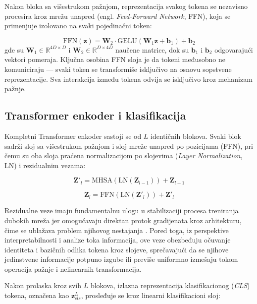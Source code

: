 Nakon bloka sa višestrukom pažnjom, reprezentacija svakog tokena se nezavisno procesira kroz mrežu unapred (engl. \textit{Feed-Forward Network}, FFN), koja se primenjuje izolovano na svaki pojedinačni token:

\begin{equation}
    \text{FFN}(\mathbf{z}) = \mathbf{W}_2 \cdot \text{GELU}(\mathbf{W}_1 \mathbf{z} + \mathbf{b}_1) + \mathbf{b}_2
\end{equation}
gde su $\mathbf{W}_1 \in \mathbb{R}^{4D \times D}$ i $\mathbf{W}_2 \in \mathbb{R}^{D \times 4D}$ 
naučene matrice, dok su $\mathbf{b}_1$ i $\mathbf{b}_2$ odgovarajući vektori pomeraja. Ključna osobina FFN sloja je da tokeni međusobno ne komuniciraju — 
svaki token se transformiše isključivo na osnovu sopstvene reprezentacije. Sva 
interakcija između tokena odvija se isključivo kroz mehanizam pažnje.

\subsection{Transformer enkoder i klasifikacija}

Kompletni Transformer enkoder sastoji se od $L$ identičnih blokova. Svaki blok sadrži sloj sa višestrukom pažnjom i sloj mreže unapred po pozicijama (FFN), pri čemu su oba sloja praćena normalizacijom po slojevima (\textit{Layer Normalization}, LN) i rezidualnim vezama:

\begin{equation}
    \mathbf{Z}'_l = \text{MHSA}(\text{LN}(\mathbf{Z}_{l-1})) + \mathbf{Z}_{l-1}
\end{equation}

\begin{equation}
    \mathbf{Z}_l = \text{FFN}(\text{LN}(\mathbf{Z}'_l)) + \mathbf{Z}'_l
\end{equation}

Rezidualne veze imaju fundamentalnu ulogu u stabilizaciji procesa treniranja dubokih 
mreža jer omogućavaju direktan protok gradijenata kroz arhitekturu, čime se ublažava 
problem njihovog nestajanja \cite{he2016resnet}. Pored toga, iz perspektive 
interpretabilnosti i analize toka informacija, ove veze obezbeđuju očuvanje identiteta 
i bazičnih odlika tokena kroz slojeve, sprečavajući da se njihove jedinstvene informacije 
potpuno izgube ili previše uniformno izmešaju tokom operacija pažnje i nelinearnih 
transformacija.

Nakon prolaska kroz svih $L$ blokova, izlazna reprezentacija klasifikacionog (\textit{CLS}) tokena, označena kao $\mathbf{z}^L_{cls}$, prosleđuje se kroz linearni klasifikacioni sloj:

